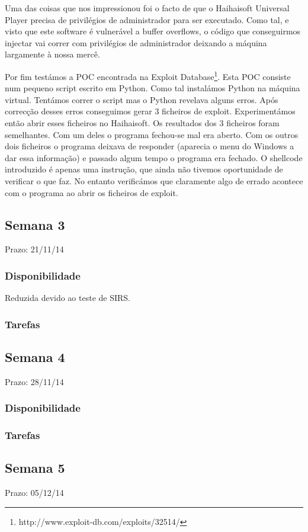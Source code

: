 \documentclass[a4paper]{article}
\begin{document}
Uma das coisas que nos impressionou foi o facto de que o Haihaisoft Universal Player precisa de privilégios de administrador para ser executado. Como tal, e visto que este software é vulnerável a buffer overflows, o código que conseguirmos injectar vai correr com privilégios de administrador deixando a máquina largamente à nossa mercê.

Por fim testámos a POC encontrada na Exploit Database\footnote{http://www.exploit-db.com/exploits/32514/}. Esta POC consiste num pequeno script escrito em Python. Como tal instalámos Python na máquina virtual. Tentámos correr o script mas o Python revelava alguns erros. Após correcção desses erros conseguimos gerar 3 ficheiros de exploit. Experimentámos então abrir esses ficheiros no Haihaisoft. Os resultados dos 3 ficheiros foram semelhantes. Com um deles o programa fechou-se mal era aberto. Com os outros dois ficheiros o programa deixava de responder (aparecia o menu do Windows a dar essa informação) e passado algum tempo o programa era fechado. O shellcode introduzido é apenas uma instrução, que ainda não tivemos oportunidade de verificar o que faz. No entanto verificámos que claramente algo de errado acontece com o programa ao abrir os ficheiros de exploit.

\subsection{Semana 3}
Prazo: 21/11/14
\subsubsection{Disponibilidade}
Reduzida devido ao teste de SIRS.

\subsubsection{Tarefas}

\subsection{Semana 4}
Prazo: 28/11/14
\subsubsection{Disponibilidade}
\subsubsection{Tarefas}

\subsection{Semana 5}
Prazo: 05/12/14
\end{document}
